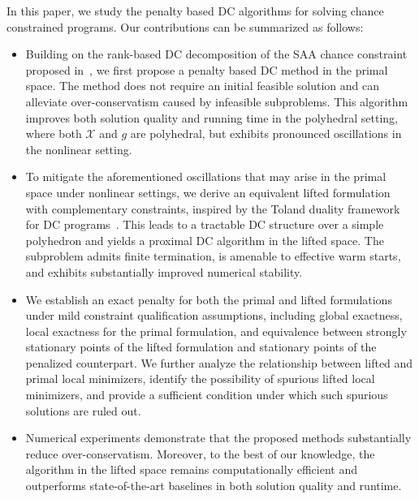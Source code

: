 \documentclass[11pt]{article}
\def\X{\mathcal{X}}
\begin{document}
In this paper, we study the penalty based DC algorithms for solving chance constrained programs. Our contributions can be summarized as follows:
\begin{itemize}
\item[(i)]
Building on the rank-based DC decomposition of the SAA chance constraint proposed in~\cite{wang2025proximal}, we first propose a penalty based DC method in the primal space. The method does not require an initial feasible solution and can alleviate over-conservatism caused by infeasible subproblems. This algorithm improves both solution quality and running time in the polyhedral setting, where both $\X$ and $g$ are polyhedral, but exhibits pronounced oscillations in the nonlinear setting.

\item[(ii)]
To mitigate the aforementioned oscillations that may arise in the primal space under nonlinear settings, we derive an equivalent lifted formulation with complementary constraints, inspired by the Toland duality framework for DC programs~\cite{toland1978duality}. This leads to a tractable DC structure over a simple polyhedron and yields a proximal DC algorithm in the lifted space. The subproblem admits finite termination, is amenable to effective warm starts, and exhibits substantially improved numerical stability.

\item[(iii)]
We establish an exact penalty for both the primal and lifted formulations under mild constraint qualification assumptions, including global exactness, local exactness for the primal formulation, and equivalence between strongly stationary points of the lifted formulation and stationary points of the penalized counterpart. We further analyze the relationship between lifted and primal local minimizers, identify the possibility of spurious lifted local minimizers, and provide a sufficient condition under which such spurious solutions are ruled out.

\item[(iv)]
Numerical experiments demonstrate that the proposed methods substantially reduce over-conservatism. Moreover, to the best of our knowledge, the algorithm in the lifted space remains computationally efficient and outperforms state-of-the-art baselines in both solution quality and runtime.
\end{itemize}
\end{document}
